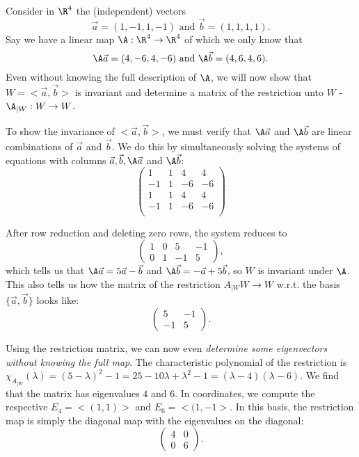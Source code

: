 \begin{example}
    Consider in $\R^4$ the (independent) vectors
    $$\vec{a}=(1,-1,1,-1) \text{ and } \vec{b}=(1,1,1,1).$$
    Say we have a linear map $\A: \R^4 \to \R^4$ of which we only know that
    $$\A\vec{a} = (4,-6,4,-6) \text{ and } \A\vec{b} = (4,6,4,6).$$
    Even without knowing the full description of $\A$, we will now show that $W = <\vec{a},\vec{b}>$ is 
    invariant and determine a matrix of the restriction unto $W$ - $\A_{|W}:W \to W$.

    To show the invariance of $<\vec{a}, \vec{b}>$, we must verify that $\A\vec{a}$ and $\A\vec{b}$ are linear combinations of $\vec{a}$ and $\vec{b}$.
    We do this by simultaneously solving the systems of equations with columns $\vec{a}, \vec{b}, \A\vec{a}$ and $\A\vec{b}$:
    $$\left(\begin{array}{cc|cc}
        1 & 1 & 4 & 4 \\
        -1 & 1 & -6 & -6 \\
        1 & 1 & 4 & 4 \\
        -1 & 1 & -6 & -6 \\
    \end{array}\right)$$

    After row reduction and deleting zero rows, the system reduces to
    $$\left( \begin{array}{cc|cc}
        1 & 0 & 5 & -1 \\
    0 & 1 & -1 & 5\end{array} \right),$$
    which tells us that $\A\vec{a} = 5\vec{a} - \vec{b}$ and $\A\vec{b} = -\vec{a} + 5\vec{b}$, so $W$ is invariant under $\A$.
    This also tells us how the matrix of the restriction $A_{|W}W \to W$ w.r.t. the basis $\{\vec{a}, \vec{b}\}$ looks like:
    $$\begin{pmatrix} 5 & -1 \\ -1 & 5 \end{pmatrix}.$$

    Using the restriction matrix, we can now even \emph{determine some eigenvectors without knowing the full map}.
    The characteristic polynomial of the restriction is $\chi_{A_{|W}}(\lambda) = (5-\lambda)^2 - 1 = 25-10\lambda+\lambda^2-1 = (\lambda-4)(\lambda-6)$.
    We find that the matrix has eigenvalues $4$ and $6$. In coordinates, we compute the respective $E_4 = <(1,1)>$ and $E_6 = <(1,-1>$.
    In this basis, the restriction map is simply the diagonal map with the eigenvalues on the diagonal:
    $$\begin{pmatrix} 4 & 0 \\ 0 & 6 \end{pmatrix}.$$


\end{example}
